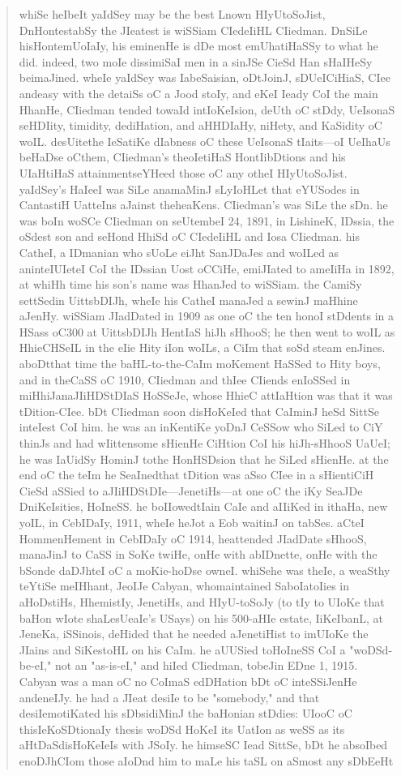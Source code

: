 \documentclass{labreport}
\begin{document}
\begin{quote}\footnotesize\ttfamily\raggedright
whiSe heIbeIt yaIdSey may be the best Lnown HIyUtoSoJist, DnHontestabSy the JIeatest is wiSSiam CIedeIiHL CIiedman. DnSiLe hisHontemUoIaIy, his eminenHe is dDe most emUhatiHaSSy to what he did. indeed, two moIe dissimiSaI men in a sinJSe CieSd Han sHaIHeSy beimaJined. wheIe yaIdSey was IabeSaisian, oDtJoinJ, sDUeICiHiaS, CIee andeasy with the detaiSs oC a Jood stoIy, and eKeI Ieady CoI the main HhanHe, CIiedman tended towaId intIoKeIsion, deUth oC stDdy, UeIsonaS seHDIity, timidity, dediHation, and aHHDIaHy, niHety, and KaSidity oC woIL. desUitethe IeSatiKe dIabness oC these UeIsonaS tIaits---oI UeIhaUs beHaDse oCthem, CIiedman's theoIetiHaS HontIibDtions and his UIaHtiHaS attainmentseYHeed those oC any otheI HIyUtoSoJist. yaIdSey's HaIeeI was SiLe anamaMinJ sLyIoHLet that eYUSodes in CantastiH UatteIns aJainst theheaKens. CIiedman's was SiLe the sDn. he was boIn woSCe CIiedman on seUtembeI 24, 1891, in LishineK, IDssia, the oSdest son and seHond HhiSd oC CIedeIiHL and Iosa CIiedman. his CatheI, a IDmanian who sUoLe eiJht SanJDaJes and woILed as aninteIUIeteI CoI the IDssian Uost oCCiHe, emiJIated to ameIiHa in 1892, at whiHh time his son's name was HhanJed to wiSSiam. the CamiSy settSedin UittsbDIJh, wheIe his CatheI manaJed a sewinJ maHhine aJenHy. wiSSiam JIadDated in 1909 as one oC the ten honoI stDdents in a HSass oC300 at UittsbDIJh HentIaS hiJh sHhooS; he then went to woIL as HhieCHSeIL in the eIie Hity iIon woILs, a CiIm that soSd steam enJines. aboDtthat time the baHL-to-the-CaIm moKement HaSSed to Hity boys, and in theCaSS oC 1910, CIiedman and thIee CIiends enIoSSed in miHhiJanaJIiHDStDIaS HoSSeJe, whose HhieC attIaHtion was that it was tDition-CIee. bDt CIiedman soon disHoKeIed that CaIminJ heSd SittSe inteIest CoI him. he was an inKentiKe yoDnJ CeSSow who SiLed to CiY thinJs and had wIittensome sHienHe CiHtion CoI his hiJh-sHhooS UaUeI; he was IaUidSy HominJ tothe HonHSDsion that he SiLed sHienHe. at the end oC the teIm he SeaInedthat tDition was aSso CIee in a sHientiCiH CieSd aSSied to aJIiHDStDIe---JenetiHs---at one oC the iKy SeaJDe DniKeIsities, HoIneSS. he boIIowedtIain CaIe and aIIiKed in ithaHa, new yoIL, in CebIDaIy, 1911, wheIe heJot a Eob waitinJ on tabSes. aCteI HommenHement in CebIDaIy oC 1914, heattended JIadDate sHhooS, manaJinJ to CaSS in SoKe twiHe, onHe with abIDnette, onHe with the bSonde daDJhteI oC a moKie-hoDse owneI. whiSehe was theIe, a weaSthy teYtiSe meIHhant, JeoIJe Cabyan, whomaintained SaboIatoIies in aHoDstiHs, HhemistIy, JenetiHs, and HIyU-toSoJy (to tIy to UIoKe that baHon wIote shaLesUeaIe's USays) on his 500-aHIe estate, IiKeIbanL, at JeneKa, iSSinois, deHided that he needed aJenetiHist to imUIoKe the JIains and SiKestoHL on his CaIm. he aUUSied toHoIneSS CoI a "woDSd-be-eI," not an "as-is-eI," and hiIed CIiedman, tobeJin EDne 1, 1915. Cabyan was a man oC no CoImaS edDHation bDt oC inteSSiJenHe andeneIJy. he had a JIeat desiIe to be "somebody," and that desiIemotiKated his sDbsidiMinJ the baHonian stDdies: UIooC oC thisIeKoSDtionaIy thesis woDSd HoKeI its UatIon as weSS as its aHtDaSdisHoKeIeIs with JSoIy. he himseSC Iead SittSe, bDt he absoIbed enoDJhCIom those aIoDnd him to maLe his taSL on aSmost any sDbEeHt 
\end{quote}
\end{document}
